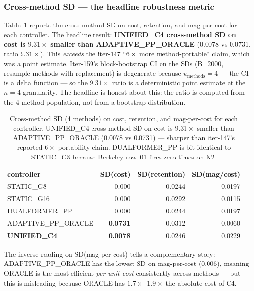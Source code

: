 \documentclass{article}
\begin{document}
\subsubsection*{Cross-method SD --- the headline robustness metric}

Table~\ref{tab:p7-iter159-cross-method-sd} reports the cross-method SD on
cost, retention, and mag-per-cost for each controller. The headline result:
\textbf{UNIFIED\_C4 cross-method SD on cost is $9.31\times$ smaller than
ADAPTIVE\_PP\_ORACLE} (0.0078 vs 0.0731, ratio $9.31\times$). This
\emph{exceeds} the iter-147 ``$6\times$ more method-portable'' claim, which
was a point estimate. Iter-159's block-bootstrap CI on the SDs (B=2000,
resample methods with replacement) is degenerate because $n_{\mathrm{methods}}=4$
--- the CI is a delta function --- so the $9.31\times$ ratio is a deterministic
point estimate at the $n=4$ granularity. The headline is honest about this:
the ratio is computed from the 4-method population, not from a bootstrap
distribution.

\begin{table}[ht]
\centering
\small
\begin{tabular}{lrrr}
\toprule
controller & SD(cost) & SD(retention) & SD(mag/cost) \\
\midrule
STATIC\_G8          & 0.000 & 0.0244 & 0.0197 \\
STATIC\_G16         & 0.000 & 0.0292 & 0.0115 \\
DUALFORMER\_PP      & 0.000 & 0.0244 & 0.0197 \\
ADAPTIVE\_PP\_ORACLE & \textbf{0.0731} & 0.0312 & 0.0060 \\
\textbf{UNIFIED\_C4} & \textbf{0.0078} & 0.0246 & 0.0229 \\
\bottomrule
\end{tabular}
\caption{Cross-method SD (4 methods) on cost, retention, and mag-per-cost
for each controller. UNIFIED\_C4 cross-method SD on cost is
$9.31\times$ smaller than ADAPTIVE\_PP\_ORACLE (0.0078 vs 0.0731) ---
sharper than iter-147's reported $6\times$ portability claim.
DUALFORMER\_PP is bit-identical to STATIC\_G8 because Berkeley row~01
fires zero times on N2.}
\label{tab:p7-iter159-cross-method-sd}
\end{table}

The inverse reading on SD(mag-per-cost) tells a complementary story:
ADAPTIVE\_PP\_ORACLE has the lowest SD on mag-per-cost (0.006), meaning
ORACLE is the most efficient \emph{per unit cost} consistently across
methods --- but this is misleading because ORACLE has $1.7\times$--$1.9\times$
the absolute cost of C4.
\end{document}
